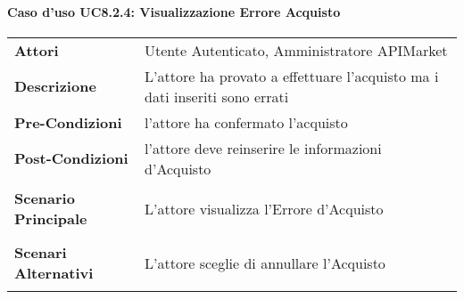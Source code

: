 \paragraph{Caso d'uso UC8.2.4: Visualizzazione Errore Acquisto}
\label{UC8.2.4}

\renewcommand*{\arraystretch}{1.6}
\begin{longtable}{ l | p{11cm}}
	\hline
	\rowcolor{Gray}
	\multicolumn{2}{c}{UC8.2.4: Visualizzazione Errore Acquisto} \\
	\hline
	\textbf{Attori} &Utente Autenticato, Amministratore APIMarket\\
	\textbf{Descrizione} & L'attore ha provato a effettuare l'acquisto ma i dati inseriti sono errati\\
	\textbf{Pre-Condizioni} &  l'attore ha confermato l'acquisto\\
	\textbf{Post-Condizioni}& l'attore deve reinserire le informazioni d'Acquisto\\
	\textbf{Scenario Principale} & \begin{enumerate*}[label=(\arabic*.),itemjoin={\newline}]
		\item L'attore visualizza l'Errore d'Acquisto
	\end{enumerate*}\\
	\textbf{Scenari Alternativi} & \begin{enumerate*}[label=(\arabic*.),itemjoin={\newline}]
		\item L'attore sceglie di annullare l'Acquisto
	\end{enumerate*}\\
\end{longtable}

